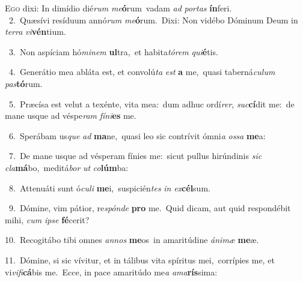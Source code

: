 \lettrine{\initial\textcolor{\initialcolor}{E}}{go} dixi: In dimídio dié\textit{rum} \textit{me}\-\textbf{ó}rum~\star vadam \textit{ad} \textit{por}\-\textit{tas} \textbf{ín}\-feri.\\
{\numbfont\textcolor{\numbcolor}{~2.}}~Quæsívi resíduum annó\textit{rum} \textit{me}\-\textbf{ó}rum.~\star Dixi: Non vidébo Dóminum Deum in \textit{ter}\-\textit{ra} \textit{vi}\-\textbf{vén}tium.\par
{\numbfont\textcolor{\numbcolor}{~3.}}~Non aspíciam hó\-\textit{mi}\-\textit{nem} \textbf{ul}\-tra,~\star et habita\-\textit{tó}\-\textit{rem} \textit{qui}\-\textbf{é}tis.\par
{\numbfont\textcolor{\numbcolor}{~4.}}~Generátio mea abláta est, et convolú\textit{ta} \textit{est} \textbf{a} me,~\star quasi taberná\-\textit{cu}\-\textit{lum} \textit{pas}\-\textbf{tó}rum.\par
{\numbfont\textcolor{\numbcolor}{~5.}}~Præcísa est velut a texénte, vita mea:~\dagger dum adhuc ordí\-\textit{rer}\-, \textit{suc}\-\textbf{cí}dit me:~\star de mane usque ad véspe\textit{ram} \textit{fí}\-\textit{ni}\textbf{es} me.\par
{\numbfont\textcolor{\numbcolor}{~6.}}~Sperábam us\textit{que} \textit{ad} \textbf{ma}\-ne,~\star quasi leo sic contrívit ómni\textit{a} \textit{os}\-\textit{sa} \textbf{me}\-a:\par
{\numbfont\textcolor{\numbcolor}{~7.}}~De mane usque ad vésperam fínies me:~\dagger sicut pullus hirúndinis \textit{sic} \textit{cla}\-\textbf{má}bo,~\star meditá\textit{bor} \textit{ut} \textit{co}\-\textbf{lúm}ba:\par
{\numbfont\textcolor{\numbcolor}{~8.}}~Attenuáti sunt ó\-\textit{cu}\-\textit{li} \textbf{me}\-i,~\star suspicién\textit{tes} \textit{in} \textit{ex}\-\textbf{cél}sum.\par
{\numbfont\textcolor{\numbcolor}{~9.}}~Dómine, vim pátior, re\-\textit{spón}\-\textit{de} \textbf{pro} me.~\star Quid dicam, aut quid respondébit mihi, \textit{cum} \textit{ip}\-\textit{se} \textbf{fé}\-cerit?\par
{\numbfont\textcolor{\numbcolor}{10.}}~Recogitábo tibi omnes \textit{an}\-\textit{nos} \textbf{me}\-os~\star in amaritúdine \textit{á}\-\textit{ni}\textit{mæ} \textbf{me}\-æ.\par
{\numbfont\textcolor{\numbcolor}{11.}}~Dómine, si sic vívitur, et in tálibus vita spíritus mei,~\dagger corrípies me, et vi\-\textit{vi}\-\textit{fi}\textbf{cá}bis me.~\star Ecce, in pace amaritúdo me\textit{a} \textit{a}\-\textit{ma}\textbf{rís}sima:\par
